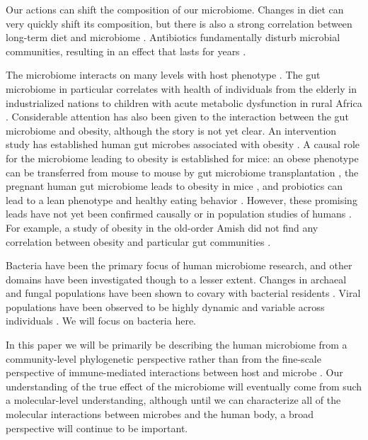 \documentclass{amsart}
\begin{document}
Our actions can shift the composition of our microbiome.
Changes in diet can very quickly shift its composition, but there is also a strong correlation between long-term diet and microbiome \citep{li2009human,wu2011linking}.
Antibiotics fundamentally disturb microbial communities, resulting in an effect that lasts for years \citep{jernberg2007long,dethlefsen2008pervasive,jakobsson2010short,dethlefsen2011incomplete}.

The microbiome interacts on many levels with host phenotype \citep[reviewed in][]{cho2012human}.
The gut microbiome in particular correlates with health of individuals from the elderly in industrialized nations \citep{claesson2012gut} to children with acute metabolic dysfunction in rural Africa \citep{smith2013gut}.
Considerable attention has also been given to the interaction between the gut microbiome and obesity, although the story is not yet clear.
An intervention study has established human gut microbes associated with obesity \citep{ley2006microbial}.
A causal role for the microbiome leading to obesity is established for mice: an obese phenotype can be transferred from mouse to mouse by gut microbiome transplantation \citep{turnbaugh2006obesity}, the pregnant human gut microbiome leads to obesity in mice \citep{koren2012host}, and probiotics can lead to a lean phenotype and healthy eating behavior \citep{poutahidis2013microbial}.
However, these promising leads have not yet been confirmed causally or in population studies of humans \citep{zhao2013gut}.
For example, a study of obesity in the old-order Amish did not find any correlation between obesity and particular gut communities \citep{zupancic2012analysis}.

Bacteria have been the primary focus of human microbiome research, and other domains have been investigated though to a lesser extent.
Changes in archaeal and fungal populations have been shown to covary with bacterial residents \citep{hoffmann2013archaea}.
Viral populations have been observed to be highly dynamic and variable across individuals \citep{reyes2010viruses,minot2011human,minot2013rapid}.
We will focus on bacteria here.

In this paper we will be primarily be describing the human microbiome from a community-level phylogenetic perspective rather than from the fine-scale perspective of immune-mediated interactions between host and microbe \citep[reviewed in][]{hooper2012interactions}.
Our understanding of the true effect of the microbiome will eventually come from such a molecular-level understanding, although until we can characterize all of the molecular interactions between microbes and the human body, a broad perspective will continue to be important.
\end{document}
